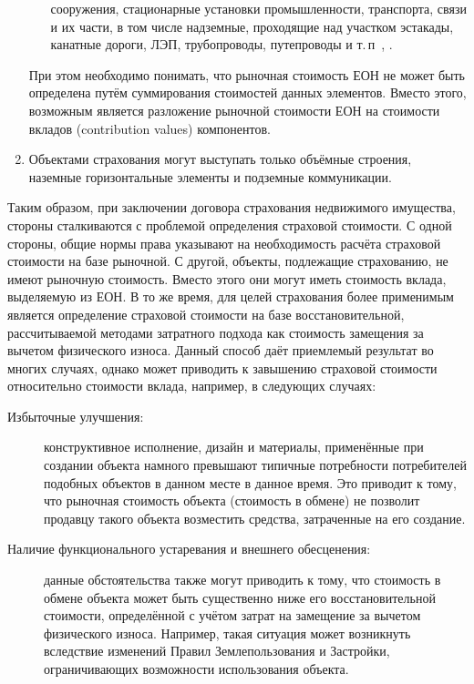 \documentclass[12pt]{scrartcl}
\begin{document}
\begin{enumerate}
\begin{itemize}
        сооружения, стационарные установки промышленности, транспорта, связи и их части,
        в том числе надземные, проходящие над участком эстакады, канатные дороги, ЛЭП,
        трубопроводы, путепроводы и т.\,п~\cite{Myagkov202409051}, \cite{Myagkov202409052}.
    \end{itemize}
    При этом необходимо понимать, что рыночная стоимость ЕОН не может быть определена путём суммирования стоимостей данных элементов. Вместо этого, возможным является разложение рыночной стоимости ЕОН на стоимости вкладов (contribution values) компонентов.
    \item Объектами страхования могут выступать только объёмные строения, наземные горизонтальные элементы и подземные коммуникации.
\end{enumerate}

Таким образом, при заключении договора страхования недвижимого имущества, стороны сталкиваются с проблемой определения страховой стоимости. С одной стороны, общие нормы права указывают на необходимость расчёта страховой стоимости на базе рыночной. С другой, объекты, подлежащие страхованию, не имеют рыночную стоимость. Вместо этого они могут иметь стоимость вклада, выделяемую из ЕОН. В то же время, для целей страхования более применимым является определение страховой стоимости на базе восстановительной, рассчитываемой методами затратного подхода как стоимость замещения за вычетом физического износа. Данный способ даёт приемлемый результат во многих случаях, однако может приводить к завышению страховой стоимости относительно стоимости вклада, например, в следующих случаях:
\begin{description}
    \item[Избыточные улучшения:] конструктивное исполнение, дизайн и материалы, применённые при создании объекта намного превышают типичные потребности потребителей подобных объектов в данном месте в данное время. Это приводит к тому, что рыночная стоимость объекта (стоимость в обмене) не позволит продавцу такого объекта возместить средства, затраченные на его создание.
    \item[Наличие функционального устаревания и внешнего обесценения:] данные обстоятельства также могут приводить к тому, что стоимость в обмене объекта может быть существенно ниже его восстановительной стоимости, определённой с учётом затрат на замещение за вычетом физического износа. Например, такая ситуация может возникнуть вследствие изменений Правил Землепользования и Застройки, ограничивающих возможности использования объекта.
\end{description}
\end{document}
